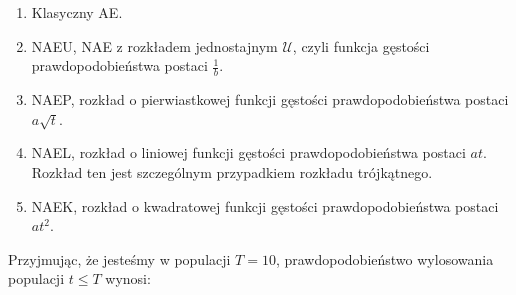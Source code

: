 \documentclass[12pt, a4paper]{article}
\begin{document}
\begin{enumerate}
 \item Klasyczny AE.
 \item NAEU, NAE z rozkładem jednostajnym $\mathcal{U}$, czyli funkcja gęstości prawdopodobieństwa postaci $\frac{1}{b}$. 
 \item NAEP, rozkład o pierwiastkowej funkcji gęstości prawdopodobieństwa postaci $a\sqrt{t}$.
 \item NAEL, rozkład o liniowej funkcji gęstości prawdopodobieństwa postaci $at$. Rozkład ten jest szczególnym przypadkiem
rozkładu trójkątnego.
 \item NAEK, rozkład o kwadratowej funkcji gęstości prawdopodobieństwa postaci $at^2$.
\end{enumerate}

Przyjmując, że jesteśmy w populacji $T = 10$, prawdopodobieństwo wylosowania populacji $t \leq T$ wynosi:
\end{document}
